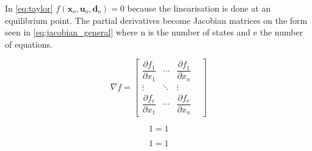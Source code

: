In \cref{eq:taylor} $f(\textbf{x}_o, \textbf{u}_o, \textbf{d}_o) = 0$ because the linearisation is done at an equilibrium point. The partial derivatives become Jacobian matrices on the form seen in \cref{eq:jacobian_general} where n is the number of states and e the number of equations.

\begin{equation} \label{eq:jacobian_general}
	\nabla f = 	\begin{bmatrix}
					\dfrac{\partial f_1}{\partial x_1} & \cdots & \dfrac{\partial f_1}{\partial x_n} & \\
					\vdots & \ddots & \vdots & \\
					\dfrac{\partial f_e}{\partial x_1} & \cdots & \dfrac{\partial f_e}{\partial x_n} &
				\end{bmatrix}
\end{equation}



\begin{equation} \label{eq:}
	1=1
\end{equation}

\begin{equation} \label{eq:}
	1=1
\end{equation}